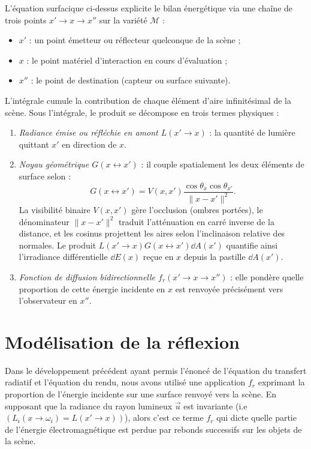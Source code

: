 L'équation surfacique ci-dessus explicite le bilan énergétique via une chaîne de trois points $x' \to x \to x''$ sur la variété $\mathcal{M}$ :
\begin{itemize}
    \item $x'$ : un point émetteur ou réflecteur quelconque de la scène ;
    \item $x$ : le point matériel d'interaction en cours d'évaluation ;
    \item $x''$ : le point de destination (capteur ou surface suivante).
\end{itemize}

L'intégrale cumule la contribution de chaque élément d'aire infinitésimal de la scène. Sous l'intégrale, le produit se décompose en trois termes physiques :
\begin{enumerate}
    \item \emph{Radiance émise ou réfléchie en amont $L(x' \to x)$} : la quantité de lumière quittant $x'$ en direction de $x$.
    \item \emph{Noyau géométrique $G(x \leftrightarrow x')$} : il couple spatialement les deux éléments de surface selon :
    \begin{equation}
        G(x \leftrightarrow x') = V(x, x') \frac{\cos\theta_x \cos\theta_{x'}}{\|x - x'\|^2}.
    \end{equation}
    La visibilité binaire $V(x, x')$ gère l'occlusion (ombres portées), le dénominateur $\|x - x'\|^2$ traduit l'atténuation en carré inverse de la distance, et les cosinus projettent les aires selon l'inclinaison relative des normales. Le produit $L(x' \to x) G(x \leftrightarrow x') \dd A(x')$ quantifie ainsi l'irradiance différentielle $\dd E(x)$ reçue en $x$ depuis la pastille $\dd A(x')$.
    \item \emph{Fonction de diffusion bidirectionnelle $f_r(x' \to x \to x'')$} : elle pondère quelle proportion de cette énergie incidente en $x$ est renvoyée précisément vers l'observateur en $x''$.
\end{enumerate}



\section{Modélisation de la réflexion}

Dans le développement précédent ayant permis l'énoncé de l'équation du transfert radiatif et l'équation du rendu, nous avons utilisé une application $f_r$ exprimant la proportion de l'énergie incidente sur une surface renvoyé vers la scène. 
En supposant que la radiance du rayon lumineux $ \vec{u}$ est invariante (i.e $(L_i(x \rightarrow \omega_i) = L(x' \to x))$), alors c'est ce terme $f_r$ qui dicte quelle partie de l'énergie électromagnétique est perdue par rebonds successifs sur les objets de la scène. 


